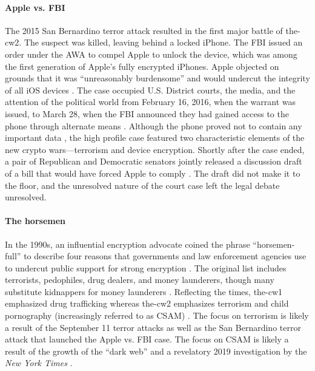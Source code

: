 \paragraph*{Apple vs. FBI} The 2015 San Bernardino terror attack resulted in the first major battle of \ac{the-cw2}. The
suspect was killed, leaving behind a locked iPhone. The \ac{FBI} issued an order under the \acrlong{AWA} to compel Apple
to unlock the device, which was among the first generation of Apple's fully encrypted iPhones. Apple objected on grounds
that it was ``unreasonably burdensome'' and would undercut the integrity of all iOS devices \cite{schulze_clipper_2017}.
The case occupied U.S. District courts, the media, and the attention of the political world from February 16, 2016, when
the warrant was issued, to March 28, when the \ac{FBI} announced they had gained access to the phone through alternate
means \cite{novet_2016}. Although the phone proved not to contain any important data \cite{schulze_clipper_2017}, the
high profile case featured two characteristic elements of the new crypto wars---terrorism and device encryption. Shortly
after the case ended, a pair of Republican and Democratic senators jointly released a discussion draft of a bill that
would have forced Apple to comply \cite{burr_2016}. The draft did not make it to the floor, and the unresolved nature of
the court case left the legal debate unresolved.

\paragraph*{The \Ac{horsemen}} In the 1990s, an influential encryption advocate coined the phrase ``\ac{horsemen-full}''
to describe four reasons that governments and law enforcement agencies use to undercut public support for strong
encryption \cite{may_1994}. The original list includes terrorists, pedophiles, drug dealers, and money launderers,
though many substitute kidnappers for money launderers \cite{schneier_scaring_2019}. Reflecting the times, \ac{the-cw1}
emphasized drug trafficking whereas \ac{the-cw2} emphasizes terrorism and child pornography (increasingly referred to as
\ac{CSAM}) \cite{schulze_clipper_2017}. The focus on terrorism is likely a result of the September 11 terror attacks as
well as the San Bernardino terror attack that launched the Apple vs. \ac{FBI} case. The focus on \ac{CSAM} is likely a
result of the growth of the ``dark web'' and a revelatory 2019 investigation by the \textit{New York Times}
\cite{keller_internet_2019}.

